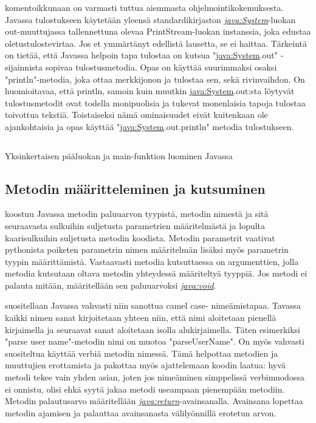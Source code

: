\documentclass{tufte-book}
\newcommand{\java}[1]{\underline{\gls{java:#1}}}
\newcommand{\newjava}[1]{\textit{\java{#1}}}
\newcommand{\code}[3]{
\begin{listing}
    \inputminted{java}{OhjelmointiopasEsimerkit/src/#1/#2.java}
    \caption{#3}
    \label{Java-#1-#2}
\end{listing}
}
\begin{document}
 komentoikkunaan on varmasti tuttua aiemmasta
ohjelmointikokemuksesta. Javassa tulostukseen käytetään yleensä standardikirjaston 
\newjava{System}-luokan out-muuttujassa tallennettuna olevaa PrintStream-luokan instanssia, joka
edustaa oletustulostevirtaa. Jos et ymmärtänyt edellistä lausetta, se ei haittaa. Tärkeintä on
tietää, että Javassa helpoin tapa tulostaa on kutsua "\java{System}.out" - sijainnista sopivaa
tulostusmetodia. Opas on käyttää suurimmaksi osaksi "println"-metodia, joka ottaa merkkijonon ja
tulostaa sen, sekä rivinvaihdon. On huomioitavaa, että println, samoin kuin muutkin
\java{System}.out:sta löytyvät tulostusmetodit ovat todella monipuolisia ja tukevat monenlaisia
tapoja tulostaa toivottua tekstiä. Toistaiseksi nämä ominaisuudet eivät kuitenkaan ole
ajankohtaisia ja opas käyttää "\java{System}.out.println" metodia tulostukseen.

\code{week2/basicexamples}{HelloWorld}{Yksinkertaisen pääluokan ja main-funktion luominen Javassa}

\subsection{Metodin määritteleminen ja kutsuminen}
\label{metodi}

 koostuu Javassa metodin paluuarvon tyypistä, metodin nimestä
ja sitä seuraavasta sulkuihin suljetusta parametrien määritelmästä ja lopulta kaarisulkuihin
suljetusta metodin koodista. Metodin parametrit vaativat pythonista poiketen parametrin nimen
määritelmän lisäksi myös parametrin tyypin määrittämistä. Vastaavasti metodia kutsuttaessa on
argumenttien, jolla metodia kutsutaan oltava metodin yhteydessä määriteltyä tyyppiä. Jos metodi
ei palauta mitään, määritellään sen paluuarvoksi \newjava{void}.

 suositellaan Javassa vahvasti niin sanottua camel case-
nimeämistapaa. Tavassa kaikki nimen sanat kirjoitetaan yhteen niin, että nimi aloitetaan
pienellä kirjaimella ja seuraavat sanat aloitetaan isolla alukirjaimella. Täten esimerkiksi
"parse user name"-metodin nimi on muotoa "parseUserName". On myös vahvasti suositeltua käyttää
verbiä metodin nimessä. Tämä helpottaa metodien ja muuttujien erottamista ja pakottaa
myös ajattelemaan koodin laatua: hyvä metodi tekee vain yhden asian, joten jos nimeäminen
simppelissä verbimuodossa ei onnistu, olisi ehkä syytä jakaa metodi useampaan pienempään
metodiin. Metodin palautusarvo määritellään \newjava{return}-avainsanalla. Avainsana lopettaa
metodin ajamisen ja palauttaa avainsanasta välilyönnillä erotetun arvon.
\end{document}
